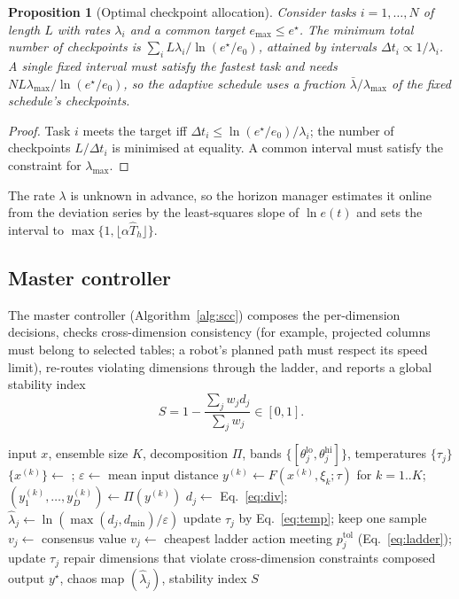\documentclass[preprint,12pt]{elsarticle}
\newtheorem{proposition}{Proposition}
\begin{document}
\begin{proposition}[Optimal checkpoint allocation]
\label{prop:alloc}
Consider tasks $i=1,\dots,N$ of length $L$ with rates $\lambda_i$ and a common target $e_{\max}\le e^\star$. The minimum total number of checkpoints is $\sum_i L\lambda_i/\ln(e^\star/e_0)$, attained by intervals $\Delta t_i\propto1/\lambda_i$. A single fixed interval must satisfy the fastest task and needs $NL\lambda_{\max}/\ln(e^\star/e_0)$, so the adaptive schedule uses a fraction $\bar\lambda/\lambda_{\max}$ of the fixed schedule's checkpoints.
\end{proposition}
\begin{proof}
Task $i$ meets the target iff $\Delta t_i\le\ln(e^\star/e_0)/\lambda_i$; the number of checkpoints $L/\Delta t_i$ is minimised at equality. A common interval must satisfy the constraint for $\lambda_{\max}$.
\end{proof}
The rate $\lambda$ is unknown in advance, so the horizon manager estimates it online from the deviation series by the least-squares slope of $\ln e(t)$ and sets the interval to $\max\{1,\lfloor\alpha\hat T_h\rfloor\}$.

\subsection{Master controller}
The master controller (Algorithm~\ref{alg:scc}) composes the per-dimension decisions, checks cross-dimension consistency (for example, projected columns must belong to selected tables; a robot's planned path must respect its speed limit), re-routes violating dimensions through the ladder, and reports a global stability index
\begin{equation}
S=1-\frac{\sum_j w_jd_j}{\sum_j w_j}\in[0,1].
\end{equation}

\begin{algorithm}[t]
\caption{Selective Chaos Control for one agent step}
\label{alg:scc}
\begin{algorithmic}[1]
\Require input $x$, ensemble size $K$, decomposition $\Pi$, bands $\{[\theta_j^{\mathrm{lo}},\theta_j^{\mathrm{hi}}]\}$, temperatures $\{\tau_j\}$
\State $\{x^{(k)}\}\gets$ ; $\varepsilon\gets$ mean input distance
\State $y^{(k)}\gets F(x^{(k)},\xi_k;\tau)$ for $k=1..K$; \quad $(y^{(k)}_1,\dots,y^{(k)}_D)\gets\Pi(y^{(k)})$
  \State $d_j\gets$ Eq.~\eqref{eq:div};\quad $\hat\lambda_j\gets\ln(\max(d_j,d_{\min})/\varepsilon)$
   \State update $\tau_j$ by Eq.~\eqref{eq:temp}; keep one sample
   \State $v_j\gets$ consensus value
  \Else \State $v_j\gets$ cheapest ladder action meeting $p_j^{\mathrm{tol}}$ (Eq.~\eqref{eq:ladder}); update $\tau_j$
  \EndIf
\EndFor
\State repair dimensions that violate cross-dimension constraints
\State \Return composed output $y^\star$, chaos map $(\hat\lambda_j)$, stability index $S$
\end{algorithmic}
\end{algorithm}
\end{document}
